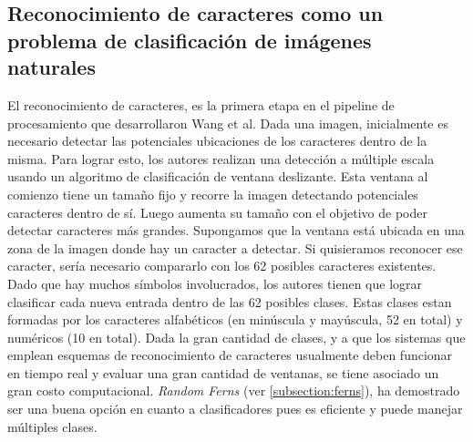 \subsection{Reconocimiento de caracteres como un problema de clasificación de imágenes naturales}
\label{subsection: wang_recon_caracteres}
	
	El reconocimiento de caracteres, es la primera etapa en el pipeline de procesamiento que desarrollaron Wang et al. Dada una imagen, inicialmente es necesario detectar las potenciales ubicaciones de los caracteres dentro de la misma. Para lograr esto, los autores realizan una detección a múltiple escala usando un algoritmo de clasificación de ventana deslizante. Esta ventana al comienzo tiene un tamaño fijo y  recorre la imagen detectando potenciales caracteres dentro de sí. Luego aumenta su tamaño con el objetivo de poder detectar caracteres más grandes. Supongamos que la ventana está ubicada en una zona de la imagen donde hay un caracter a detectar. Si quisieramos reconocer ese caracter, sería necesario compararlo con los 62 posibles caracteres existentes. Dado que hay muchos símbolos involucrados, los autores tienen que lograr clasificar cada nueva entrada dentro de las 62 posibles clases. Estas clases estan formadas por los caracteres alfabéticos (en minúscula y mayúscula, 52 en total) y numéricos (10 en total). Dada la gran cantidad de clases, y a que los sistemas que emplean esquemas de reconocimiento de caracteres usualmente deben funcionar en tiempo real y evaluar una gran cantidad de ventanas, se tiene asociado un gran costo computacional. \textit{Random Ferns} (ver \ref{subsection:ferns}), ha demostrado ser una buena opción en cuanto a clasificadores pues es eficiente y puede manejar múltiples clases.
	
	
